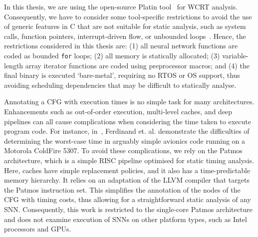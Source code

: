 In this thesis, we are using the open-source Platin
tool~\cite{compiler:platin:kps15} for \ac{WCRT}
analysis. Consequently, we have to consider some tool-specific
restrictions to avoid the use of generic features in C that are not
suitable for static analysis, such as system calls, function pointers, interrupt-driven flow, or unbounded loops~\cite{RTOSWCET}.
Hence, the restrictions considered in this thesis are: (1) all neural
network functions are coded as bounded \texttt{for} loops; (2) all
memory is statically allocated; (3) variable-length array iterator
functions are coded using preprocessor macros; and (4) the final binary is executed `bare-metal', requiring no
RTOS or OS support, thus avoiding scheduling dependencies
that may be difficult to statically analyse.

Annotating a \ac{CFG} with execution times is no simple task for many architectures.
Enhancements such as out-of-order execution, multi-level caches, and deep pipelines can all cause complications when considering the time taken to execute program code.
For instance, in~\cite{AirplaneWcet}, Ferdinand et. al. demonstrate the difficulties of determining the worst-case time in arguably simple avionics code running on a Motorola ColdFire 5307.
To avoid these complications, we rely on the Patmos~\cite{patmos:ppes2011} architecture, which is a simple RISC pipeline optimised for static timing analysis. 
Here, caches have simple replacement policies, and it also has a time-predictable memory hierarchy.
It relies on an adaptation of the LLVM compiler that targets the Patmos instruction set.
This simplifies the annotation of the nodes of the \ac{CFG} with
timing costs, thus allowing for a straightforward static analysis of any
\ac{SNN}. Consequently, this work is restricted to the single-core
Patmos architecture and does not examine execution of \acp{SNN} on
other platform types, such as Intel processors and GPUs.

